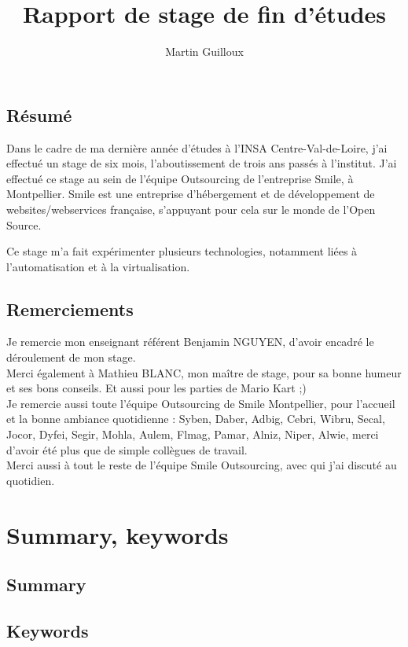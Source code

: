 \documentclass[14 pt]{extreport}
\title{\textbf{Rapport de stage de fin d'études}}
\author{Martin Guilloux}
\begin{document}
\maketitle

\section*{Résumé}
Dans le cadre de ma dernière année d'études à l'INSA Centre-Val-de-Loire, j'ai effectué un stage de six mois, l'aboutissement de trois ans passés à l'institut. J'ai effectué ce stage au sein de l'équipe Outsourcing de l'entreprise Smile, à Montpellier. Smile est une entreprise d'hébergement et de développement de websites/webservices française, s'appuyant pour cela sur le monde de l'Open Source.

Ce stage m'a fait expérimenter plusieurs technologies, notamment liées à l'automatisation et à la virtualisation.

\section*{Remerciements}
Je remercie mon enseignant référent Benjamin NGUYEN, d'avoir encadré le déroulement de mon stage.\\
Merci également à Mathieu BLANC, mon maître de stage, pour sa bonne humeur et ses bons conseils. Et aussi pour les parties de Mario Kart ;)\\ %
Je remercie aussi toute l'équipe Outsourcing de Smile Montpellier, pour l'accueil et la bonne ambiance quotidienne : Syben, Daber, Adbig, Cebri, Wibru, Secal, Jocor, Dyfei, Segir, Mohla, Aulem, Flmag, Pamar, Alniz, Niper, Alwie, merci d'avoir été plus que de simple collègues de travail.\\
Merci aussi à tout le reste de l'équipe Smile Outsourcing, avec qui j'ai discuté au quotidien. 


\tableofcontents

\chapter*{Summary, keywords}
\section*{Summary}
\lipsum[1]\lipsum[1]
\section*{Keywords}
\lipsum[1]
\end{document}
